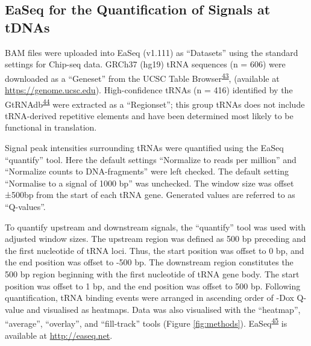 \documentclass[
  12pt,
]{article}
\begin{document}
\hypertarget{easeq-for-the-quantification-of-signals-at-tdnas}{%
\subsection{EaSeq for the Quantification of Signals at tDNAs}\label{easeq-for-the-quantification-of-signals-at-tdnas}}

BAM files were uploaded into EaSeq (v1.111) as ``Datasets'' using the standard settings for Chip-seq data.
GRCh37 (hg19) tRNA sequences (n = 606) were downloaded as a ``Geneset'' from the UCSC Table Browser\textsuperscript{\protect\hyperlink{ref-Karolchik2004}{43}}, (available at \url{https://genome.ucsc.edu}).
High-confidence tRNAs (n = 416) identified by the GtRNAdb\textsuperscript{\protect\hyperlink{ref-Chan2016}{44}} were extracted as a ``Regionset''; this group tRNAs does not include tRNA-derived repetitive elements and have been determined most likely to be functional in translation.

Signal peak intensities surrounding tRNAs were quantified using the EaSeq ``quantify'' tool.
Here the default settings ``Normalize to reads per million'' and ``Normalize counts to DNA-fragments'' were left checked.
The default setting ``Normalise to a signal of 1000 bp'' was unchecked.
The window size was offset ±500bp from the start of each tRNA gene.
Generated values are referred to as ``Q-values''.

To quantify upstream and downstream signals, the ``quantify'' tool was used with adjusted window sizes.
The upstream region was defined as 500 bp preceding and the first nucleotide of tRNA loci.
Thus, the start position was offset to 0 bp, and the end position was offset to -500 bp.
The downstream region constitutes the 500 bp region beginning with the first nucleotide of tRNA gene body.
The start position was offset to 1 bp, and the end position was offset to 500 bp.
Following quantification, tRNA binding events were arranged in ascending order of -Dox Q-value and visualised as heatmaps.
Data was also visualised with the ``heatmap'', ``average'', ``overlay'', and ``fill-track'' tools (Figure \ref{fig:methods}).
EaSeq\textsuperscript{\protect\hyperlink{ref-lerdrup2016}{45}} is available at \url{http://easeq.net}.
\end{document}
